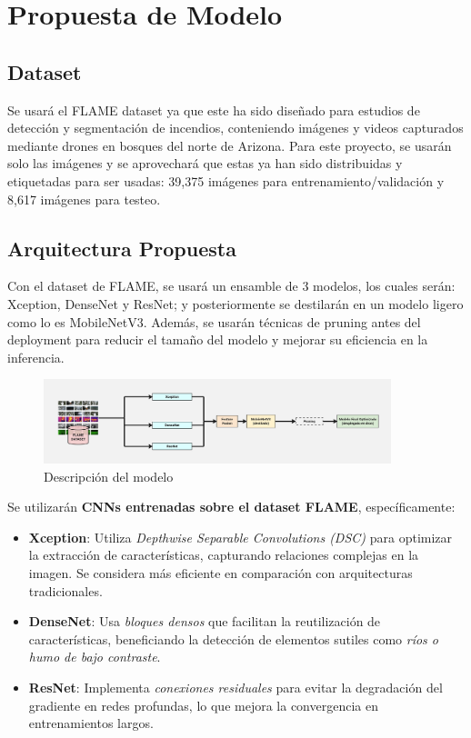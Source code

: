 \section{Propuesta de Modelo}

\subsection{Dataset}
Se usará el FLAME dataset \cite{FLAME_Dataset} ya que este ha sido diseñado para estudios de
detección y segmentación de incendios, conteniendo imágenes y videos capturados mediante
drones en bosques del norte de Arizona. Para este proyecto, se usarán solo las imágenes y
se aprovechará que estas ya han sido distribuidas y etiquetadas para ser usadas:
39,375 imágenes para entrenamiento/validación y 8,617 imágenes para testeo.

\subsection{Arquitectura Propuesta}
Con el dataset de FLAME, se usará un ensamble de 3 modelos, los cuales serán: Xception,
DenseNet y ResNet; y posteriormente se destilarán en un modelo ligero como lo es
MobileNetV3. Además, se usarán técnicas de pruning antes del deployment para reducir
el tamaño del modelo y mejorar su eficiencia en la inferencia.

\begin{figure}[h]
    \centering
    \includegraphics[width=0.9\textwidth]{images/model}
    \caption{Descripción del modelo}
    \label{fig:model}
\end{figure}

Se utilizarán \textbf{CNNs entrenadas sobre el dataset FLAME}, específicamente:

\begin{itemize}
    \item \textbf{Xception}: Utiliza \textit{Depthwise Separable Convolutions (DSC)} para optimizar la extracción de características, capturando relaciones complejas en la imagen. Se considera más eficiente en comparación con arquitecturas tradicionales.
    \item \textbf{DenseNet}: Usa \textit{bloques densos} que facilitan la reutilización de características, beneficiando la detección de elementos sutiles como \textit{ríos o humo de bajo contraste}.
    \item \textbf{ResNet}: Implementa \textit{conexiones residuales} para evitar la degradación del gradiente en redes profundas, lo que mejora la convergencia en entrenamientos largos.
\end{itemize}

